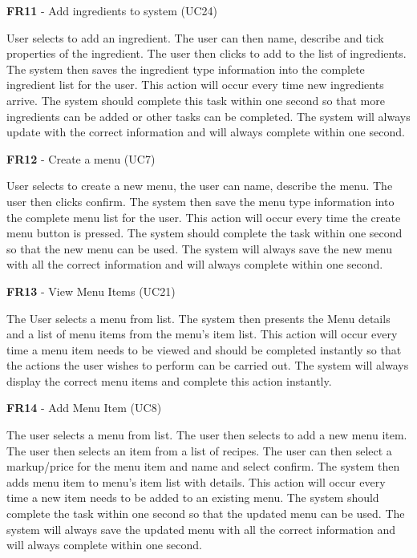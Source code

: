 \noindent \textbf{FR11} - Add ingredients to system (UC24)\\
\begin{small}
	User selects to add an ingredient. The user can then name, describe and tick properties of the ingredient. The user then clicks to add to the list of ingredients. The system then saves the ingredient type information into the complete ingredient list for the user. This action will occur every time new ingredients arrive. The system should complete this task within one second so that more ingredients can be added or other tasks can be completed. The system will always update with the correct information and will always complete within one second. \\
\end{small}
\linebreak



\noindent \textbf{FR12} - Create a menu (UC7)\\
\begin{small}
	User selects to create a new menu, the user can name, describe the menu. The user then clicks confirm. The system then save the menu type information into the complete menu list for the user. This action will occur every time the create menu button is pressed. The system should complete the task within one second so that the new menu can be used. The system will always save the new menu with all the correct information and will always complete within one second.\\
\end{small}
\linebreak

\noindent \textbf{FR13} - View Menu Items (UC21)\\
\begin{small}
	The User selects a menu from list. The system then presents the Menu details and a list of menu items from the menu’s item list. This action will occur every time a menu item needs to be viewed and should be completed instantly so that the actions the user wishes to perform can be carried out. The system will always display the correct menu items and complete this action instantly.\\
\end{small}
\linebreak

\noindent \textbf{FR14} - Add Menu Item (UC8)\\
\begin{small}
	The user selects a menu from list. The user then selects to add a new menu item. The user then selects an item from a list of recipes. The user can then select a markup/price for the menu item and name and select confirm. The system then adds menu item to menu’s item list with details. This action will occur every time a new item needs to be added to an existing menu. The system should complete the task within one second so that the updated menu can be used. The system will always save the updated menu with all the correct information and will always complete within one second.\\
\end{small}
\linebreak

